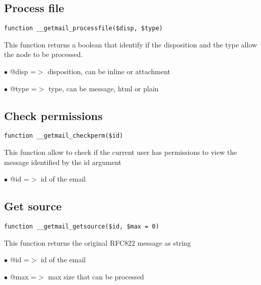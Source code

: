 \documentclass[a4paper]{book}
\begin{document}
\hypertarget{toc534}{}
\subsection{Process file}

\begin{lstlisting}
function __getmail_processfile($disp, $type)
\end{lstlisting}

This function returns a boolean that identify if the disposition and the type
allow the node to be processed.

\begin{compactitem}
\item[\color{myblue}$\bullet$] @disp =$>$ disposition, can be inline or attachment
\item[\color{myblue}$\bullet$] @type =$>$ type, can be message, html or plain
\end{compactitem}

\hypertarget{toc535}{}
\subsection{Check permissions}

\begin{lstlisting}
function __getmail_checkperm($id)
\end{lstlisting}

This function allow to check if the current user has permissions to view the
message identified by the id argument

\begin{compactitem}
\item[\color{myblue}$\bullet$] @id =$>$ id of the email
\end{compactitem}

\hypertarget{toc536}{}
\subsection{Get source}

\begin{lstlisting}
function __getmail_getsource($id, $max = 0)
\end{lstlisting}

This function returns the original RFC822 message as string

\begin{compactitem}
\item[\color{myblue}$\bullet$] @id  =$>$ id of the email
\item[\color{myblue}$\bullet$] @max =$>$ max size that can be processed
\end{compactitem}
\end{document}
